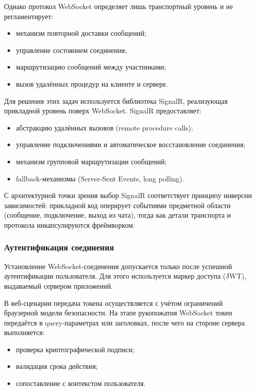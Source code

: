 \documentclass{article}
\begin{document}
Однако протокол WebSocket определяет лишь транспортный уровень и не регламентирует:
\begin{itemize}
\item механизм повторной доставки сообщений;
\item управление состоянием соединения;
\item маршрутизацию сообщений между участниками;
\item вызов удалённых процедур на клиенте и сервере.
\end{itemize}

Для решения этих задач используется библиотека SignalR, реализующая прикладной уровень поверх WebSocket. SignalR предоставляет:
\begin{itemize}
\item абстракцию удалённых вызовов (remote procedure calls);
\item управление подключениями и автоматическое восстановление соединения;
\item механизм групповой маршрутизации сообщений;
\item fallback-механизмы (Server-Sent Events, long polling).
\end{itemize}

С архитектурной точки зрения выбор SignalR соответствует принципу инверсии зависимостей: прикладной код оперирует событиями предметной области (сообщение, подключение, выход из чата), тогда как детали транспорта и протокола инкапсулируются фреймворком.

\subsubsection{Аутентификация соединения}

Установление WebSocket-соединения допускается только после успешной аутентификации пользователя. Для этого используется маркер доступа (JWT), выдаваемый сервером приложений.

В веб-сценарии передача токена осуществляется с учётом ограничений браузерной модели безопасности. На этапе рукопожатия WebSocket токен передаётся в query-параметрах или заголовках, после чего на стороне сервера выполняется:
\begin{itemize}
\item проверка криптографической подписи;
\item валидация срока действия;
\item сопоставление с контекстом пользователя.
\end{itemize}
\end{document}
